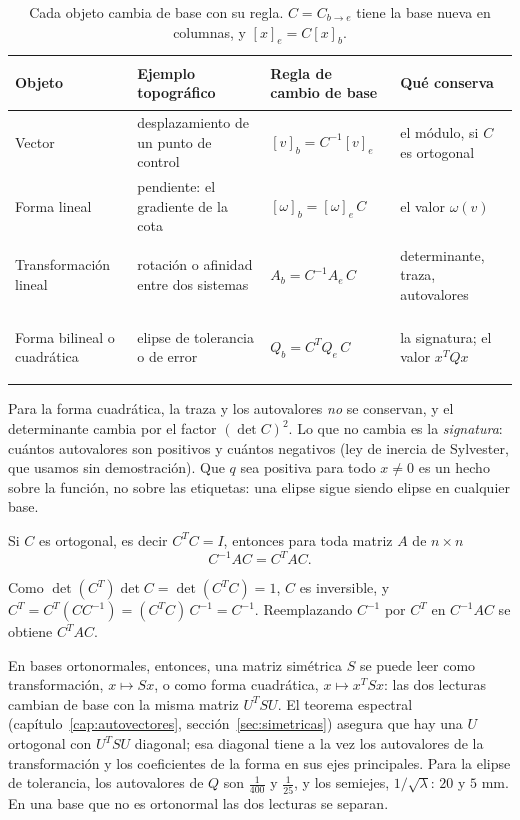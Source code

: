 \begin{table}[tbp]
\centering
\caption{Cada objeto cambia de base con su regla. \(C=C_{b\to e}\) tiene la base nueva en
columnas, y \([x]_e=C[x]_b\).}\label{tab:regla-de-cada-objeto}
{\small
\begin{tabularx}{\textwidth}{>{\bfseries\raggedright\arraybackslash}p{24mm}>{\raggedright\arraybackslash}X>{\centering\arraybackslash}p{30mm}>{\raggedright\arraybackslash}X}
\toprule
Objeto & Ejemplo topográfico & Regla de cambio de base & Qué conserva\\
\midrule
Vector & desplazamiento de un punto de control & \([v]_b=C^{-1}[v]_e\) & el módulo, si \(C\) es ortogonal\\
Forma lineal & pendiente: el gradiente de la cota & \([\omega]_b=[\omega]_e\,C\) & el valor \(\omega(v)\)\\
Transformación lineal & rotación o afinidad entre dos sistemas & \(A_b=C^{-1}A_e\,C\) & determinante, traza, autovalores\\
Forma bilineal o cuadrática & elipse de tolerancia o de error & \(Q_b=C^TQ_e\,C\) & la signatura; el valor \(x^TQx\)\\
\bottomrule
\end{tabularx}
}
\end{table}

Para la forma cuadrática, la traza y los autovalores \emph{no} se conservan, y el determinante
cambia por el factor \((\det C)^2\). Lo que no cambia es la \emph{signatura}: cuántos
autovalores son positivos y cuántos negativos (ley de inercia de Sylvester, que usamos sin
demostración). Que \(q\) sea positiva para todo \(x\neq0\) es un hecho sobre la función, no
sobre las etiquetas: una elipse sigue siendo elipse en cualquier base.

\begin{proposicion}\label{prop:congruencia-ortogonal}
Si \(C\) es ortogonal, es decir \(C^TC=I\), entonces para toda matriz \(A\) de \(n\times n\)
\[
  C^{-1}AC=C^TAC .
\]
\end{proposicion}

\begin{demostracion}
Como \(\det(C^T)\det C=\det(C^TC)=1\), \(C\) es inversible, y
\(C^T=C^T(CC^{-1})=(C^TC)\,C^{-1}=C^{-1}\). Reemplazando \(C^{-1}\) por \(C^T\) en
\(C^{-1}AC\) se obtiene \(C^TAC\).
\end{demostracion}

En bases ortonormales, entonces, una matriz simétrica \(S\) se puede leer como transformación,
\(x\mapsto Sx\), o como forma cuadrática, \(x\mapsto x^TSx\): las dos lecturas cambian de base
con la misma matriz \(U^TSU\). El teorema espectral (capítulo~\ref{cap:autovectores},
sección~\ref{sec:simetricas}) asegura que hay una \(U\) ortogonal con \(U^TSU\) diagonal; esa
diagonal tiene a la vez los autovalores de la transformación y los coeficientes de la forma
en sus ejes principales. Para la elipse de tolerancia, los autovalores de \(Q\) son
\(\tfrac1{400}\) y \(\tfrac1{25}\), y los semiejes, \(1/\sqrt{\lambda}\): \(20\) y \(5\) mm. En
una base que no es ortonormal las dos lecturas se separan.


